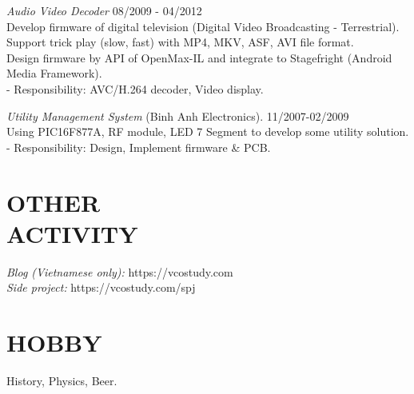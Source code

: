 \documentclass[margin]{res}
\begin{document}
\begin{resume}
                {\sl Audio Video Decoder} \hfill            08/2009 - 04/2012 \\
                 Develop firmware of digital television (Digital Video Broadcasting - Terrestrial).\\
                 Support trick play (slow, fast) with MP4, MKV, ASF, AVI file format.\\
                 Design firmware by API of OpenMax-IL and integrate to Stagefright (Android Media Framework).\\
		 - Responsibility: AVC/H.264 decoder, Video display.


                {\sl Utility Management System} (Binh Anh Electronics). \hfill        11/2007-02/2009 \\
                Using PIC16F877A, RF module, LED 7 Segment to develop some utility solution.\\
		- Responsibility: Design, Implement firmware \& PCB.

 
\section{OTHER \\ ACTIVITY}  
		{\sl Blog (Vietnamese only):} https://vcostudy.com \\
		{\sl Side project:} https://vcostudy.com/spj

\section{HOBBY}  History, Physics, Beer.


\end{resume}
\end{document}
